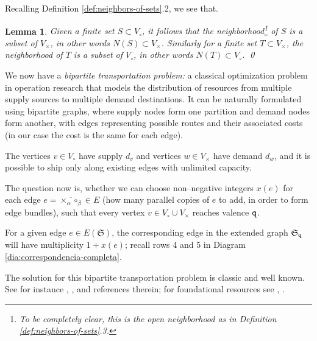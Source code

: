 \documentclass[final,3p,times]{elsarticle}
\newtheorem{lemma}[theorem]{Lemma}
\theoremstyle{definition}
\begin{document}
Recalling Definition \ref{def:neighbors-of-sets}.2, we 
see that.

\begin{lemma}
Given a finite set $S\subset V_\circ$, it follows that 
the neighborhood\footnote{
To be completely clear, this is the open neighborhood as in 
Definition \ref{def:neighbors-of-sets}.3.
}
of $S$ is a subset of $V_\times$, in other words
$N(S)\subset V_\times$. 
Similarly for a finite set $T\subset V_\times$, the neighborhood of $T$ is 
a subset of $V_\circ$, in other words
$N(T)\subset V_\circ$.
\hfill\qed
\end{lemma}

We now have a \emph{bipartite transportation problem:}
a classical optimization problem in operation research that models the distribution of resources from multiple supply sources to multiple demand destinations. It can be naturally formulated using bipartite graphs, where supply nodes form one partition and demand nodes form another, with edges representing possible routes and their associated costs 
(in our case the cost is the same for each edge).

The vertices $v\in V_\circ$ have supply $d_v$
and vertices $w\in V_\times$ have demand $d_w$, 
and it is possible to ship only along existing 
edges with unlimited capacity.

The question now is, 
whether we can choose non--negative integers 
$x(e)$ for each edge 
$e = \overline{\times_\alpha \circ_\beta}  \in E$
(how many parallel copies of $e$ to add, in order to 
form edge bundles),
such that every vertex $v \in V_\circ \cup V_\times $ reaches valence $\tt q$.

\noindent 
For a given edge $e\in E(\mathfrak{S})$, 
the  corresponding edge in the extended graph 
$\mathfrak{S}_{\tt q}$ 
will have multiplicity $1 + x(e)$; 
recall rows 4 and 5 in Diagram \ref{dia:correspondencia-completa}.

The solution for this bipartite transportation
problem is classic and well known. 
See for instance \cite{Schrijver}, \cite{Lovasz-Plummer}, \cite{Ford-Fulkerson} 
and references therein; for foundational resources see \cite{Gale}, \cite{Ryser}. 
\end{document}
